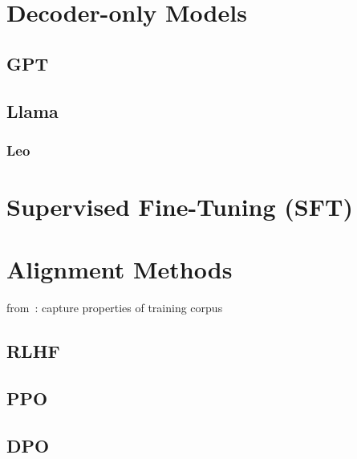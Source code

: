 



\section{Decoder-only Models}\label{sec:decoder}

\subsection{GPT}\label{subsec:gpt}

\subsection{Llama}\label{subsec:llama}

\subsubsection{Leo}


\section{Supervised Fine-Tuning (SFT)}\label{sec:supervised-fine-tuning}


\section{Alignment Methods}\label{sec:alignment-methods}
from~\autocite{zhao2023survey}:
capture properties of training corpus

\subsection{RLHF}\label{subsec:rlhf}

\subsection{PPO}\label{subsec:ppo}

\subsection{DPO}\label{subsec:dpo}
